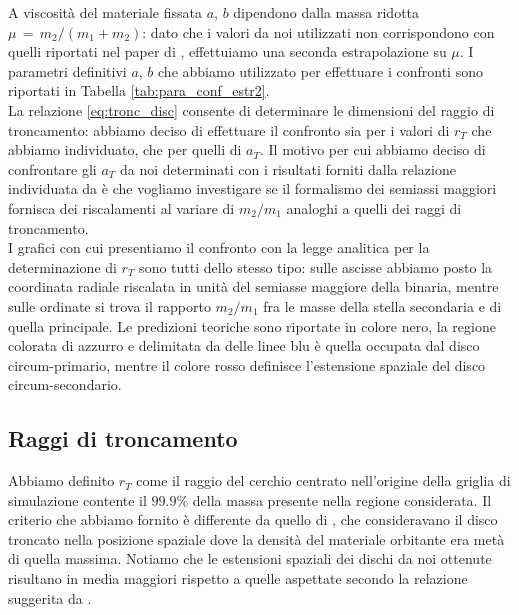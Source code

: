 A viscosità del materiale fissata $a$, $b$ dipendono dalla massa ridotta $\mu\,=\,m_2/(m_1+m_2)$: dato che i valori da noi utilizzati non corrispondono con quelli riportati nel paper di \textcite{ManaraTronc2019}, effettuiamo una seconda estrapolazione su $\mu$.
I parametri definitivi $a$, $b$ che abbiamo utilizzato per effettuare i confronti sono riportati in Tabella \ref{tab:para_conf_estr2}.\\

La relazione \eqref{eq:tronc_disc} consente di determinare le dimensioni del raggio di troncamento: abbiamo deciso di effettuare il confronto sia per i valori di $r_T$ che abbiamo individuato, che per quelli di $a_T$. 
Il motivo per cui abbiamo deciso di confrontare gli $a_T$ da noi determinati con i risultati forniti dalla relazione individuata da \textcite{ManaraTronc2019} è che vogliamo investigare se il formalismo dei semiassi maggiori fornisca dei riscalamenti al variare di $m_2/m_1$ analoghi a quelli dei raggi di troncamento.\\

I grafici con cui presentiamo il confronto con la legge analitica per la determinazione di $r_T$ sono tutti dello stesso tipo: sulle ascisse abbiamo posto la coordinata radiale riscalata in unità del semiasse maggiore della binaria, mentre sulle ordinate si trova il rapporto $m_2/m_1$ fra le masse della stella secondaria e di quella principale.
Le predizioni teoriche sono riportate in colore nero, la regione colorata di azzurro e delimitata da delle linee blu è quella occupata dal disco circum-primario, mentre il colore rosso definisce l'estensione spaziale del disco circum-secondario.

\subsection{Raggi di troncamento}

Abbiamo definito $r_T$ come il raggio del cerchio centrato nell'origine della griglia di simulazione contente il $99.9\%$ della massa presente nella regione considerata. 
Il criterio che abbiamo fornito è differente da quello di \textcite{ArtymowiczLubow1994}, che consideravano il disco troncato nella posizione spaziale dove la densità del materiale orbitante era metà di quella massima.
Notiamo che le estensioni spaziali dei dischi da noi ottenute risultano in media maggiori rispetto a quelle aspettate secondo la relazione suggerita da \textcite{ManaraTronc2019}.\\

